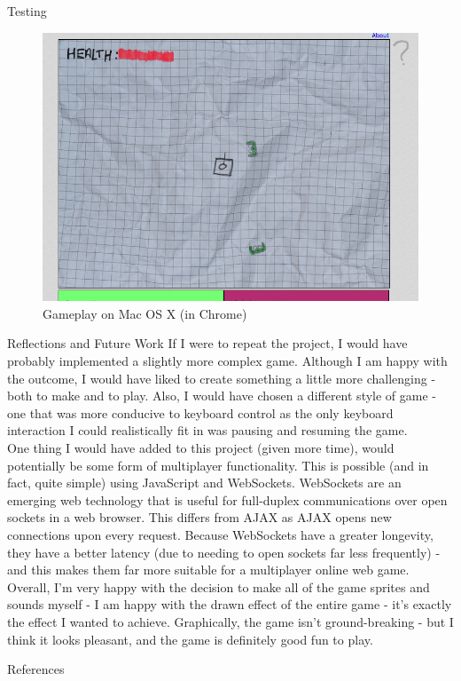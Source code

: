 \documentclass[11pt]{article}
\begin{document}
\begin{section}{Testing}
		\begin{figure}[htp]
			\centering
			\includegraphics[height=0.6\columnwidth]{img/osx}
			\caption{Gameplay on Mac OS X (in Chrome)}
		\end{figure}
	\end{section}
    
\clearpage
\begin{section}{Reflections and Future Work}
    		If I were to repeat the project, I would have probably implemented a slightly more complex game. Although I am happy with the outcome, I would have liked to create something a little more challenging - both to make and to play. Also, I would have chosen a different style of game - one that was more conducive to keyboard control as the only keyboard interaction I could realistically fit in was pausing and resuming the game. \\
    		
    		One thing I would have added to this project (given more time), would potentially be some form of multiplayer functionality. This is possible (and in fact, quite simple) using JavaScript and WebSockets. WebSockets are an emerging web technology that is useful for full-duplex communications over open sockets in a web browser\cite{WebSockets}. This differs from AJAX as AJAX opens new connections upon every request. Because WebSockets have a greater longevity, they have a better latency (due to needing to open sockets far less frequently) - and this makes them far more suitable for a multiplayer online web game. \\
    		
    		Overall, I'm very happy with the decision to make all of the game sprites and sounds myself - I am happy with the drawn effect of the entire game - it's exactly the effect I wanted to achieve. Graphically, the game isn't ground-breaking - but I think it looks pleasant, and the game is definitely good fun to play.
\end{section}


\nocite{LaTeXTemplate}

\newpage
\begin{section}{References}
	
	
\end{section}
\end{document}
